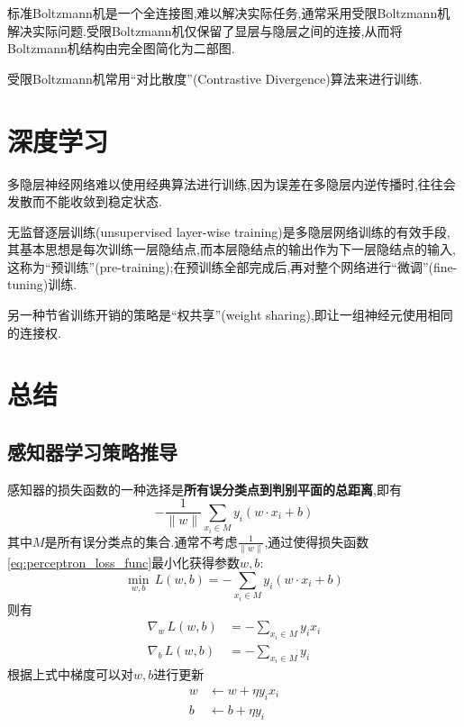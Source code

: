 标准Boltzmann机是一个全连接图,难以解决实际任务,通常采用受限Boltzmann机解决实际问题.受限Boltzmann机仅保留了显层与隐层之间的连接,从而将Boltzmann机结构由完全图简化为二部图.

受限Boltzmann机常用``对比散度''(Contrastive Divergence)算法来进行训练.

\section{深度学习}

多隐层神经网络难以使用经典算法进行训练,因为误差在多隐层内逆传播时,往往会发散而不能收敛到稳定状态.

无监督逐层训练(unsupervised layer-wise training)是多隐层网络训练的有效手段,其基本思想是每次训练一层隐结点,而本层隐结点的输出作为下一层隐结点的输入,这称为``预训练''(pre-training);在预训练全部完成后,再对整个网络进行``微调''(fine-tuning)训练.

另一种节省训练开销的策略是``权共享''(weight sharing),即让一组神经元使用相同的连接权.

\section*{总结}

\subsection*{感知器学习策略推导}

感知器的损失函数的一种选择是\textbf{所有误分类点到判别平面的总距离},即有
\begin{equation}
    -\frac{1}{\|w\|}\sum_{x_i\in M}y_i(w\cdot x_i+b)
\end{equation}
其中$M$是所有误分类点的集合.通常不考虑$\frac{1}{\|w\|}$,通过使得损失函数\ref{eq:perceptron_loss_func}最小化获得参数$w,b$:
\begin{equation}\label{eq:perceptron_loss_func}
    \min_{w,b}\,L(w,b)=-\sum_{x_i\in M}y_i(w\cdot x_i+b)
\end{equation}
则有
\begin{equation}\begin{split}
    \nabla_w\,L(w,b)&=-\sum_{x_i\in M}y_ix_i\\
    \nabla_b\,L(w,b)&=-\sum_{x_i\in M}y_i
\end{split}\end{equation}
根据上式中梯度可以对$w,b$进行更新
\begin{equation}\begin{split}
    w&\leftarrow w+\eta y_ix_i\\
    b&\leftarrow b+\eta y_i
\end{split}\end{equation}
